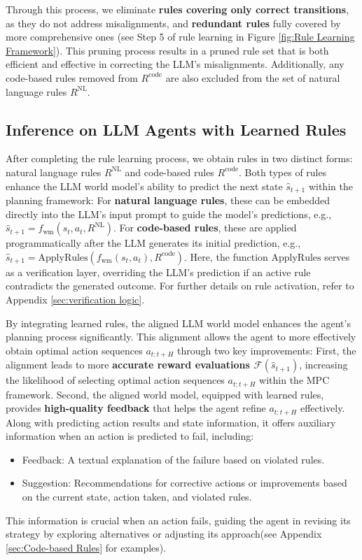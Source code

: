 \documentclass{article} %
\begin{document}
Through this process, we eliminate \textbf{rules covering only correct transitions}, as they do not address misalignments, and \textbf{redundant rules} fully covered by more comprehensive ones (see Step 5 of rule learning in Figure \ref{fig:Rule Learning Framework}). 
This pruning process results in a pruned rule set that is both efficient and effective in correcting the LLM's misalignments. Additionally, any code-based rules removed from $R^{\text{code}}$ are also excluded from the set of natural language rules $R^{\text{NL}}$.




\subsection{Inference on LLM Agents with Learned Rules}
\label{sec:Inference on LLM Agents with Learned Rules}

After completing the rule learning process, we obtain rules in two distinct forms: natural language rules $R^{\text{NL}}$ and code-based rules $R^{\text{code}}$. Both types of rules enhance the LLM world model’s ability to predict the next state $\hat{s}_{t+1}$ within the planning framework:
For \textbf{natural language rules}, these can be embedded directly into the LLM's input prompt to guide the model’s predictions, e.g., $\hat{s}_{t+1} = f_{\text{wm}}(s_{t}, a_{t}, R^{\text{NL}})$. 
For \textbf{code-based rules}, these are applied programmatically after the LLM generates its initial prediction, e.g., $\hat{s}_{t+1} = \text{ApplyRules}(f_{\text{wm}}(s_{t}, a_{t}), R^{\text{code}})$. Here, the function $\text{ApplyRules}$ serves as a verification layer, overriding the LLM's prediction if an active rule contradicts the generated outcome. For further details on rule activation, refer to Appendix \ref{sec:verification logic}.



By integrating learned rules, the aligned LLM world model enhances the agent's planning process significantly. This alignment allows the agent to more effectively obtain optimal action sequences $a_{t:t+H}$ through two key improvements:
First, the alignment leads to more \textbf{accurate reward evaluations $\mathcal{F}(\hat{s}_{t+1})$}, increasing the likelihood of selecting optimal action sequences $a_{t:t+H}$ within the MPC framework. 
Second, the aligned world model, equipped with learned rules, provides \textbf{high-quality feedback} that helps the agent refine $a_{t:t+H}$ effectively. Along with predicting action results and state information, it offers auxiliary information when an action is predicted to fail, including:
\begin{itemize}
    \item Feedback: A textual explanation of the failure based on violated rules.
    \item Suggestion: Recommendations for corrective actions or improvements based on the current state, action taken, and violated rules.
\end{itemize}
This information is crucial when an action fails, guiding the agent in revising its strategy by exploring alternatives or adjusting its approach(see Appendix \ref{sec:Code-based Rules} for examples).
\end{document}
